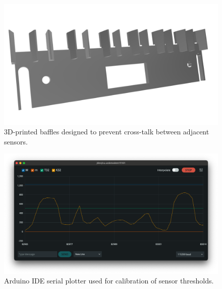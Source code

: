 \begin{figure}
    \centering
    \includegraphics[width=\linewidth]{src/images/baffles.png}
    \caption{3D-printed baffles designed to prevent cross-talk between adjacent sensors.}
    \label{fig:baffles}
\end{figure}

\begin{figure}
    \centering
    \includegraphics[width=\linewidth]{src/images/serial_monitor.png}
    \caption{Arduino IDE serial plotter used for calibration of sensor thresholds.}
    \label{fig:serial_monitor}
\end{figure}



